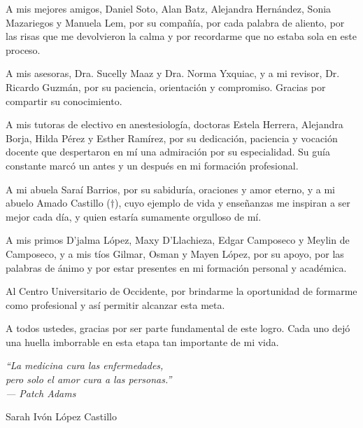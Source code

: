\documentclass[11pt,letterpaper]{report}
\begin{document}
A mis mejores amigos, Daniel Soto, Alan Batz, Alejandra Hernández, Sonia 
Mazariegos y Manuela Lem, por su compañía, por cada palabra de aliento, por 
las risas que me devolvieron la calma y por recordarme que no estaba sola en 
este proceso.

A mis asesoras, Dra. Sucelly Maaz y Dra. Norma Yxquiac, y a mi revisor, Dr. 
Ricardo Guzmán, por su paciencia, orientación y compromiso. Gracias por 
compartir su conocimiento.

A mis tutoras de electivo en anestesiología, doctoras Estela Herrera, 
Alejandra Borja, Hilda Pérez y Esther Ramírez, por su dedicación, paciencia y 
vocación docente que despertaron en mí una admiración por su especialidad. Su 
guía constante marcó un antes y un después en mi formación profesional.

A mi abuela Saraí Barrios, por su sabiduría, oraciones y amor eterno, y a mi 
abuelo Amado Castillo ($\dagger$), cuyo ejemplo de vida y enseñanzas me 
inspiran a ser mejor cada día, y quien estaría sumamente orgulloso de mí.

A mis primos D'jalma López, Maxy D'Llachieza, Edgar Camposeco y Meylin de 
Camposeco, y a mis tíos Gilmar, Osman y Mayen López, por su apoyo, por las 
palabras de ánimo y por estar presentes en mi formación personal y académica.

Al Centro Universitario de Occidente, por brindarme la oportunidad de 
formarme como profesional y así permitir alcanzar esta meta.

A todos ustedes, gracias por ser parte fundamental de este logro. Cada uno 
dejó una huella imborrable en esta etapa tan importante de mi vida.

\vspace{0.5cm}

\begin{center}
\textit{``La medicina cura las enfermedades, \\
pero solo el amor cura a las personas.''} \\
\textit{--- Patch Adams}
\end{center}

\begin{flushright}
Sarah Ivón López Castillo
\end{flushright}
\end{document}

